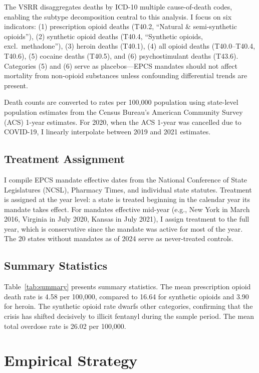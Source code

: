 \documentclass[12pt]{article}
\begin{document}
The VSRR disaggregates deaths by ICD-10 multiple cause-of-death codes, enabling the subtype decomposition central to this analysis. I focus on six indicators: (1) prescription opioid deaths (T40.2, ``Natural \& semi-synthetic opioids''), (2) synthetic opioid deaths (T40.4, ``Synthetic opioids, excl.\ methadone''), (3) heroin deaths (T40.1), (4) all opioid deaths (T40.0--T40.4, T40.6), (5) cocaine deaths (T40.5), and (6) psychostimulant deaths (T43.6). Categories (5) and (6) serve as placebos---EPCS mandates should not affect mortality from non-opioid substances unless confounding differential trends are present.

Death counts are converted to rates per 100,000 population using state-level population estimates from the Census Bureau's American Community Survey (ACS) 1-year estimates. For 2020, when the ACS 1-year was cancelled due to COVID-19, I linearly interpolate between 2019 and 2021 estimates.

\subsection{Treatment Assignment}

I compile EPCS mandate effective dates from the National Conference of State Legislatures (NCSL), Pharmacy Times, and individual state statutes. Treatment is assigned at the year level: a state is treated beginning in the calendar year its mandate takes effect. For mandates effective mid-year (e.g., New York in March 2016, Virginia in July 2020, Kansas in July 2021), I assign treatment to the full year, which is conservative since the mandate was active for most of the year. The 20 states without mandates as of 2024 serve as never-treated controls.

\subsection{Summary Statistics}



Table~\ref{tab:summary} presents summary statistics. The mean prescription opioid death rate is 4.58 per 100,000, compared to 16.64 for synthetic opioids and 3.90 for heroin. The synthetic opioid rate dwarfs other categories, confirming that the crisis has shifted decisively to illicit fentanyl during the sample period. The mean total overdose rate is 26.02 per 100,000.

\section{Empirical Strategy}
\end{document}
